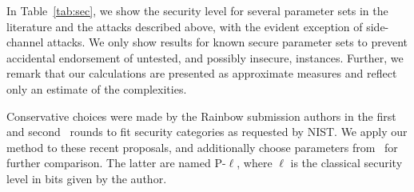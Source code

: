 \documentclass[12pt, a4paper, oneside]{memoir}
\theoremstyle{definition}
\begin{document}
In Table~\ref{tab:sec}, we show the security level for several parameter sets in the literature and the attacks described above, with the evident exception of side-channel attacks. We only show results for known secure parameter sets to prevent accidental endorsement of untested, and possibly insecure, instances. Further, we remark that our calculations are presented as approximate measures and reflect only an estimate of the complexities.

Conservative choices were made by the Rainbow submission authors in the first~\cite{Ding:201712} and second~\cite{Ding:201901} rounds to fit security categories as requested by NIST\@. We apply our method to these recent proposals, and additionally choose parameters from~\cite[Tabs.~6.12,~9.8]{Petzoldt:201307} for further comparison. The latter are named P-$\ell$, where $\ell$ is the classical security level in bits given by the author.
\end{document}
